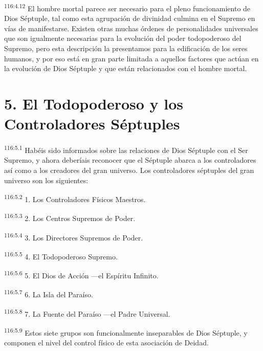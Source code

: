 \par
\textsuperscript{116:4.12} El hombre mortal parece ser necesario para el pleno funcionamiento de Dios Séptuple, tal como esta agrupación de divinidad culmina en el Supremo en vías de manifestarse. Existen otras muchas órdenes de personalidades universales que son igualmente necesarias para la evolución del poder todopoderoso del Supremo, pero esta descripción la presentamos para la edificación de los seres humanos, y por eso está en gran parte limitada a aquellos factores que actúan en la evolución de Dios Séptuple y que están relacionados con el hombre mortal.

\section*{5. El Todopoderoso y los Controladores Séptuples}
\par
\textsuperscript{116:5.1} Habéis sido informados sobre las relaciones de Dios Séptuple con el Ser Supremo, y ahora deberíais reconocer que el Séptuple abarca a los controladores así como a los creadores del gran universo. Los controladores séptuples del gran universo son los siguientes:

\par
\textsuperscript{116:5.2} 1. Los Controladores Físicos Maestros.

\par
\textsuperscript{116:5.3} 2. Los Centros Supremos de Poder.

\par
\textsuperscript{116:5.4} 3. Los Directores Supremos de Poder.

\par
\textsuperscript{116:5.5} 4. El Todopoderoso Supremo.

\par
\textsuperscript{116:5.6} 5. El Dios de Acción ---el Espíritu Infinito.

\par
\textsuperscript{116:5.7} 6. La Isla del Paraíso.

\par
\textsuperscript{116:5.8} 7. La Fuente del Paraíso ---el Padre Universal.

\par
\textsuperscript{116:5.9} Estos siete grupos son funcionalmente inseparables de Dios Séptuple, y componen el nivel del control físico de esta asociación de Deidad.

